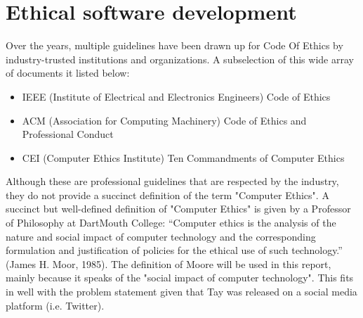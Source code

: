 \section{Ethical software development}
Over the years, multiple guidelines have been drawn up for Code Of Ethics by industry-trusted institutions and organizations. A subselection of this wide array of documents it listed below:
\begin{itemize}
	\item IEEE (Institute of Electrical and Electronics Engineers) Code of Ethics
	\item ACM (Association for Computing Machinery) Code of Ethics and Professional Conduct
	\item CEI (Computer Ethics Institute) Ten Commandments of Computer Ethics
\end{itemize}
Although these are professional guidelines that are respected by the industry, they do not provide a succinct definition of the term "Computer Ethics". A succinct but well-defined definition of "Computer Ethics" is given by a Professor of Philosophy at DartMouth College: “Computer ethics is the analysis of the nature and social impact of computer technology and the corresponding formulation and justification of policies for the ethical use of such technology.” (James H. Moor, 1985).
The definition of Moore will be used in this report, mainly because it speaks of the "social impact of computer technology". This fits in well with the problem statement given that Tay was released on a social media platform (i.e. Twitter).
